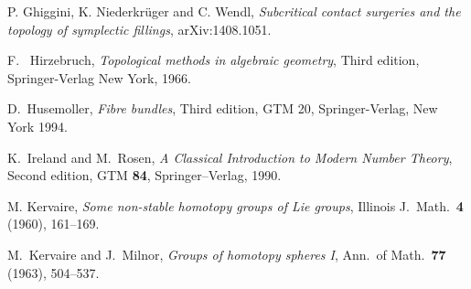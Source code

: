 \documentclass[12pt]{amsart}
\theoremstyle{remark}
\begin{document}
\begin{thebibliography}{999}

 P. Ghiggini, K.  Niederkr\"uger and  C. Wendl,
{\em Subcritical contact surgeries and the topology of symplectic fillings},
arXiv:1408.1051.

 F.~ Hirzebruch, {\em Topological methods in algebraic geometry}, Third edition, Springer-Verlag New York, 1966.

 D.~Husemoller, {\em Fibre bundles}, Third edition, GTM 20, Springer-Verlag, New York 1994.

 K.~Ireland and M.~Rosen, {\em A Classical Introduction to Modern Number Theory}, Second edition, GTM \textbf{84}, Springer--Verlag, 1990.


 M. Kervaire, {\em Some non{-}stable homotopy groups of Lie groups}, Illinois J.~Math.~{\bf 4} (1960), 161--169.

 M.~Kervaire and J.~Milnor, 
{\em Groups of homotopy spheres I}, Ann.~of Math.~{\bf 77} (1963), 504--537.
 







\end{thebibliography}
\end{document}
